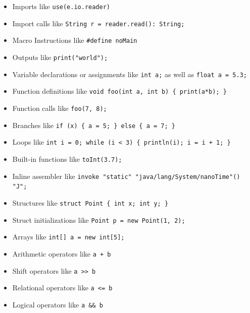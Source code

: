 \begin{itemize}
	\item Imports like \texttt{use(e.io.reader)}
	\item Import calls like \texttt{String r = reader.read(): String;}
	\item Macro Instructions like \texttt{\#define noMain}
	\item Outputs like \texttt{print("world");}
	\item Variable declarations or assignments like \texttt{int a;} as well as \texttt{float a = 5.3;}
	\item Function definitions like \texttt{void foo(int a, int b) \{ print(a*b); \}}
	\item Function calls like \texttt{foo(7, 8);}
	\item Branches like \texttt{if (x) \{ a = 5; \} else \{ a = 7; \}}
	\item Loops like \texttt{int i = 0; while (i < 3) \{ println(i); i = i + 1; \}}
	\item Built-in functions like \texttt{toInt(3.7);}
	\item Inline assembler like \texttt{invoke "static" "java/lang/System/nanoTime"() "J";}
	\item Structures like \texttt{struct Point \{ int x; int y; \}}
	\item Struct initializations like \texttt{Point p = new Point(1, 2);}
	\item Arrays like \texttt{int[] a = new int[5];}
	\item Arithmetic operators like \texttt{a + b}
	\item Shift operators like \texttt{a >> b}
	\item Relational operators like \texttt{a <= b}
	\item Logical operators like \texttt{a \&\& b}	
\end{itemize}

